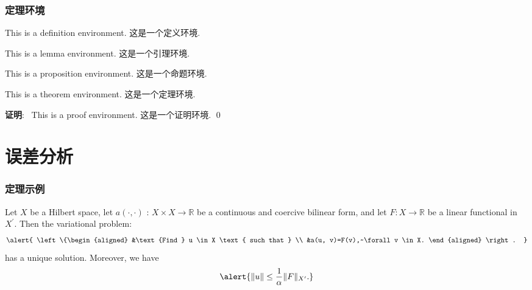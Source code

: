 \documentclass[noamsthm,notheorem,11pt,compress]{beamer}
\numberwithin{figure}{section}
\numberwithin{table}{section}
\numberwithin{equation}{section}
\theoremstyle{plain} %
\newenvironment{proof}[1][证明]{\textbf{#1}:~}{\qed\par}
\begin{document}
\begin{frame}
\frametitle{定理环境}
\begin{definition}
This is a definition environment. 这是一个定义环境.
\end{definition}

\begin{lemma}
This is a lemma environment. 这是一个引理环境.
\end{lemma}

\begin{proposition}
This is a proposition environment. 这是一个命题环境.
\end{proposition}

\begin{theorem}
This is a theorem environment. 这是一个定理环境.
\end{theorem}

\begin{proof}
  This is a proof environment. 这是一个证明环境.
\end{proof}

\end{frame}

\section{误差分析}

\begin{frame}
\frametitle{定理示例}

\begin{theorem}
Let $X$ be a Hilbert space, let $a(\cdot, \cdot)$ : $X \times X \rightarrow \mathbb{R}$ be a continuous and coercive bilinear form, and let $F : X \rightarrow \mathbb{R}$ be a linear functional in $X^{\prime}$. Then the variational problem:
\begin{equation}
  \alert{
  \left\{\begin{aligned}
  &\text {Find } u \in X \text { such that } \\
  &a(u, v)=F(v),~\forall v \in X.
  \end{aligned} \right. }
\end{equation}
has a unique solution. Moreover, we have
\begin{equation}
  \alert{ \|u\| \leq \frac{1}{\alpha}\|F\|_{X^{\prime}}.  }
\end{equation}
\end{theorem}

\end{frame}
\end{document}
